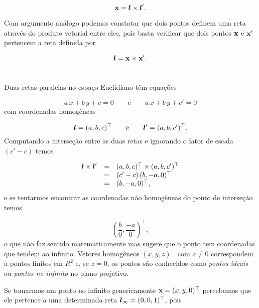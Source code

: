 \begin{equation*}
\mathbf{x}=\boldsymbol{l}\times\boldsymbol{l}'.
\end{equation*}


Com argumento análogo podemos constatar que dois pontos definem uma reta através do produto vetorial entre eles, pois basta verificar que dois pontos $\mathbf{x}$ e $\mathbf{x}'$ pertencem a reta definida por

\begin{equation*}
\boldsymbol{l}=\mathbf{x}\times\mathbf{x}'.
\end{equation*}\\



Duas retas paralelas no espaço Euclidiano têm equações

\begin{equation*}
a\,x+b\,y+c=0\qquad\text{e}\qquad a\,x+b\,y+c'=0
\end{equation*}
com coordenadas homogêneas

\begin{equation*}
\boldsymbol{l}=(a,b,c)^\top\qquad\text{e}\qquad\boldsymbol{l}'=(a,b,c')^\top.
\end{equation*}
Computando a interseção entre as duas retas e ignorando o fator de escala $(c'-c)$ temos

\begin{equation*}
\begin{array}{rcl}
\boldsymbol{l}\times\boldsymbol{l}'&=&(a,b,c)^\top\times(a,b,c')^\top\\
&=&(c'-c)\,(b,-a,0)^\top\\
&=&(b,-a,0)^\top,
\end{array}
\end{equation*}
e se tentarmos encontrar as coordenadas não homogêneas do ponto de interseção temos

\begin{equation*}
\left(\frac{b}{0},\frac{-a}{0}\right)^\top,
\end{equation*}
o que não faz sentido matematicamente mas sugere que o ponto tem coordenadas que tendem ao infinito. Vetores homogêneos $(x,y,z)^\top$ com $z\neq0$ correspondem a pontos finitos em $R^2$ e, se $z=0$, os pontos são conhecidos como \textit{pontos ideais} ou \textit{pontos no infinito} no plano projetivo.

Se tomarmos um ponto no infinito genericamente $\mathbf{x}=(x,y,0)^\top$ percebemos que ele pertence a uma determinada reta $\boldsymbol{l}_\infty=(0,0,1)^\top$, pois

